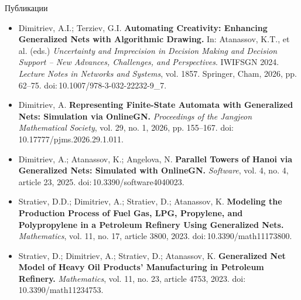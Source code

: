 \documentclass[aspectratio=169]{beamer}
\begin{document}
\begin{frame}{Публикации}
\scriptsize
\begin{itemize}
    \setlength{\itemsep}{1.5em}

    \item Dimitriev, A.I.; Terziev, G.I. \textbf{Automating Creativity: Enhancing Generalized Nets with Algorithmic Drawing.} In: Atanassov, K.T., et al. (eds.) \textit{Uncertainty and Imprecision in Decision Making and Decision Support -- New Advances, Challenges, and Perspectives}. IWIFSGN 2024. \textit{Lecture Notes in Networks and Systems}, vol. 1857. Springer, Cham, 2026, pp. 62--75. doi:\,10.1007/978-3-032-22232-9\_7.

    \item Dimitriev, A. \textbf{Representing Finite-State Automata with Generalized Nets: Simulation via OnlineGN.} \textit{Proceedings of the Jangjeon Mathematical Society}, vol. 29, no. 1, 2026, pp. 155--167. doi:\,10.17777/pjms.2026.29.1.011.

    \item Dimitriev, A.; Atanassov, K.; Angelova, N. \textbf{Parallel Towers of Hanoi via Generalized Nets: Simulated with OnlineGN.} \textit{Software}, vol. 4, no. 4, article 23, 2025. doi:\,10.3390/software4040023.

    \item Stratiev, D.D.; Dimitriev, A.; Stratiev, D.; Atanassov, K. \textbf{Modeling the Production Process of Fuel Gas, LPG, Propylene, and Polypropylene in a Petroleum Refinery Using Generalized Nets.} \textit{Mathematics}, vol. 11, no. 17, article 3800, 2023. doi:\,10.3390/math11173800.

    \item Stratiev, D.; Dimitriev, A.; Stratiev, D.; Atanassov, K. \textbf{Generalized Net Model of Heavy Oil Products' Manufacturing in Petroleum Refinery.} \textit{Mathematics}, vol. 11, no. 23, article 4753, 2023. doi:\,10.3390/math11234753.
\end{itemize}
\end{frame}
\end{document}
